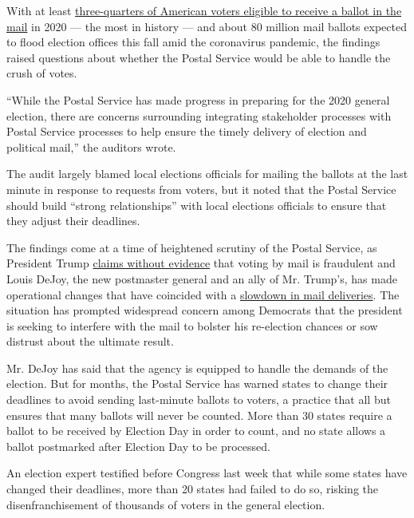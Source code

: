 With at least
\href{https://www.nytimes3xbfgragh.onion/interactive/2020/08/11/us/politics/vote-by-mail-us-states.html}{three-quarters
of American voters eligible to receive a ballot in the mail} in 2020 ---
the most in history --- and about 80 million mail ballots expected to
flood election offices this fall amid the coronavirus pandemic, the
findings raised questions about whether the Postal Service would be able
to handle the crush of votes.

``While the Postal Service has made progress in preparing for the 2020
general election, there are concerns surrounding integrating stakeholder
processes with Postal Service processes to help ensure the timely
delivery of election and political mail,'' the auditors wrote.

The audit largely blamed local elections officials for mailing the
ballots at the last minute in response to requests from voters, but it
noted that the Postal Service should build ``strong relationships'' with
local elections officials to ensure that they adjust their deadlines.

The findings come at a time of heightened scrutiny of the Postal
Service, as President Trump
\href{https://www.nytimes3xbfgragh.onion/2020/06/24/us/politics/trump-vote-by-mail.html}{claims
without evidence} that voting by mail is fraudulent and Louis DeJoy, the
new postmaster general and an ally of Mr. Trump's, has made operational
changes that have coincided with a
\href{https://www.nytimes3xbfgragh.onion/2020/07/31/us/politics/trump-usps-mail-delays.html}{slowdown
in mail deliveries}. The situation has prompted widespread concern among
Democrats that the president is seeking to interfere with the mail to
bolster his re-election chances or sow distrust about the ultimate
result.

Mr. DeJoy has said that the agency is equipped to handle the demands of
the election. But for months, the Postal Service has warned states to
change their deadlines to avoid sending last-minute ballots to voters, a
practice that all but ensures that many ballots will never be counted.
More than 30 states require a ballot to be received by Election Day in
order to count, and no state allows a ballot postmarked after Election
Day to be processed.

An election expert testified before Congress last week that while some
states have changed their deadlines, more than 20 states had failed to
do so, risking the disenfranchisement of thousands of voters in the
general election.

